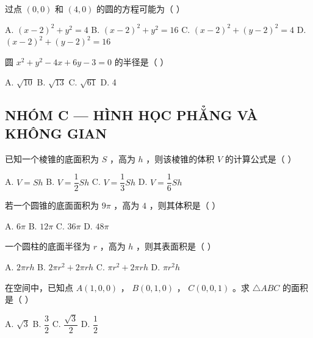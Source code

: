 \documentclass[11pt, a4paper]{article}
\begin{document}
\begin{baitap}[18]
过点 $(0,0)$ 和 $(4,0)$ 的圆的方程可能为（ ）
\par\vspace{3pt}
\noindent A. $(x - 2)^2 + y^2 = 4$ \quad B. $(x - 2)^2 + y^2 = 16$ \quad C. $(x - 2)^2 + (y - 2)^2 = 4$ \quad D. $(x - 2)^2 + (y - 2)^2 = 16$
\end{baitap}

\begin{baitap}[19]
圆 $x^2 + y^2 - 4x + 6y - 3 = 0$ 的半径是（ ）
\par\vspace{3pt}
\noindent A. $\sqrt{10}$ \quad B. $\sqrt{13}$ \quad C. $\sqrt{61}$ \quad D. 4
\end{baitap}

\subsection*{NHÓM C — HÌNH HỌC PHẲNG VÀ KHÔNG GIAN}

\begin{baitap}[20]
已知一个棱锥的底面积为 $S$ ，高为 $h$ ，则该棱锥的体积 $V$ 的计算公式是（ ）
\par\vspace{3pt}
\noindent A. $V = Sh$ \quad B. $V = \dfrac{1}{2}Sh$ \quad C. $V = \dfrac{1}{3}Sh$ \quad D. $V = \dfrac{1}{6}Sh$
\end{baitap}

\begin{baitap}[21]
若一个圆锥的底面面积为 $9\pi$ ，高为 $4$ ，则其体积是（ ）
\par\vspace{3pt}
\noindent A. $6\pi$ \quad B. $12\pi$ \quad C. $36\pi$ \quad D. $48\pi$
\end{baitap}

\begin{baitap}[22]
一个圆柱的底面半径为 $r$ ，高为 $h$ ，则其表面积是（ ）
\par\vspace{3pt}
\noindent A. $2\pi rh$ \quad B. $2\pi r^2 + 2\pi rh$ \quad C. $\pi r^2 + 2\pi rh$ \quad D. $\pi r^2 h$
\end{baitap}

\begin{baitap}[23]
在空间中，已知点 $A(1,0,0)$ ， $B(0,1,0)$ ， $C(0,0,1)$ 。求 $\triangle ABC$ 的面积是（ ）
\par\vspace{3pt}
\noindent A. $\sqrt{3}$ \quad B. $\dfrac{3}{2}$ \quad C. $\dfrac{\sqrt{3}}{2}$ \quad D. $\dfrac{1}{2}$
\end{baitap}
\end{document}
